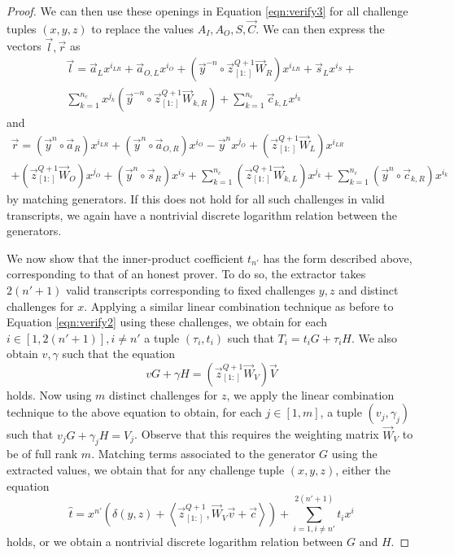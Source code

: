 \documentclass{article}
\newcommand{\mat}[1]{\vec{#1}}
\newcommand{\zq}{\vec{z}^{Q+1}_{[1:]}}
\begin{document}
\begin{proof}
	We can then use these openings in Equation \ref{eqn:verify3} for all challenge tuples $(x, y, z)$ to replace the values $A_I, A_O, S, \vec{C}$.
	We can then express the vectors $\vec{l}, \vec{r}$ as
	\begin{multline*}
		\vec{l} = \vec{a}_L x^{i_{LR}} + \vec{a}_{O,L} x^{i_O} + \left( \vec{y}^{-n} \circ \zq \mat{W}_R \right) x^{i_{LR}} + \vec{s}_L x^{i_S} + \\
		\sum_{k=1}^{n_c} x^{j_k} \left( \vec{y}^{-n} \circ \zq \mat{W}_{k,R} \right) + \sum_{k=1}^{n_c} \vec{c}_{k,L} x^{i_k}
	\end{multline*}
	and
	\begin{multline*}
	\vec{r} = \left( \vec{y}^n \circ \vec{a}_R \right) x^{i_{LR}} + \left( \vec{y}^n \circ \vec{a}_{O,R} \right) x^{i_O} - \vec{y}^n x^{j_O} + \left( \zq \mat{W}_L \right) x^{i_{LR}} \\
	+ \left( \zq \mat{W}_O \right) x^{j_O} + \left( \vec{y}^n \circ \vec{s}_R \right) x^{i_S} + \sum_{k=1}^{n_c} \left( \zq \mat{W}_{k,L} \right) x^{j_k} + \sum_{k=1}^{n_c} \left( \vec{y}^n \circ \vec{c}_{k,R} \right) x^{i_k}
	\end{multline*}
	by matching generators.
	If this does not hold for all such challenges in valid transcripts, we again have a nontrivial discrete logarithm relation between the generators.

	We now show that the inner-product coefficient $t_{n'}$ has the form described above, corresponding to that of an honest prover.
	To do so, the extractor takes $2(n' + 1)$ valid transcripts corresponding to fixed challenges $y, z$ and distinct challenges for $x$.
	Applying a similar linear combination technique as before to Equation \ref{eqn:verify2} using these challenges, we obtain for each $i \in [1, 2(n' + 1)], i \neq n'$ a tuple $(\tau_i, t_i)$ such that $T_i = t_i G + \tau_i H$.
	We also obtain $v, \gamma$ such that the equation
	$$v G + \gamma H = \left( \zq \mat{W}_V \right) \vec{V}$$
	holds.
	Now using $m$ distinct challenges for $z$, we apply the linear combination technique to the above equation to obtain, for each $j \in [1,m]$, a tuple $(v_j, \gamma_j)$ such that $v_j G + \gamma_j H = V_j$.
	Observe that this requires the weighting matrix $\mat{W}_V$ to be of full rank $m$.
	Matching terms associated to the generator $G$ using the extracted values, we obtain that for any challenge tuple $(x, y, z)$, either the equation
	$$\widehat{t} = x^{n'} \left( \delta(y, z) + \left\langle \zq, \mat{W}_V \vec{v} + \vec{c} \right\rangle \right) + \sum_{i=1, i \neq n'}^{2(n' + 1)} t_i x^i$$
	holds, or we obtain a nontrivial discrete logarithm relation between $G$ and $H$.


\end{proof}
\end{document}

